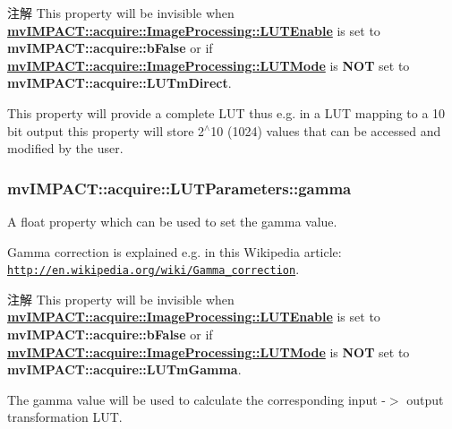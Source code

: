 \begin{DoxyNote}{注解}
This property will be invisible when {\bfseries \hyperlink{classmv_i_m_p_a_c_t_1_1acquire_1_1_image_processing_a7f8eb83578d97fde3405e6ae5d09e5c3}{mv\+I\+M\+P\+A\+C\+T\+::acquire\+::\+Image\+Processing\+::\+L\+U\+T\+Enable}} is set to {\bfseries mv\+I\+M\+P\+A\+C\+T\+::acquire\+::b\+False} or if {\bfseries \hyperlink{classmv_i_m_p_a_c_t_1_1acquire_1_1_image_processing_ae2f3059a3574e6a08a2d4348f1d5a152}{mv\+I\+M\+P\+A\+C\+T\+::acquire\+::\+Image\+Processing\+::\+L\+U\+T\+Mode}} is {\bfseries N\+O\+T} set to {\bfseries mv\+I\+M\+P\+A\+C\+T\+::acquire\+::\+L\+U\+Tm\+Direct}.
\end{DoxyNote}
This property will provide a complete L\+U\+T thus e.\+g. in a L\+U\+T mapping to a 10 bit output this property will store 2$^\wedge$10 (1024) values that can be accessed and modified by the user. \hypertarget{classmv_i_m_p_a_c_t_1_1acquire_1_1_l_u_t_parameters_a3be2f11e6b176d9b9494116d992b2e00}{
\subsubsection[{gamma}]{ mv\+I\+M\+P\+A\+C\+T\+::acquire\+::\+L\+U\+T\+Parameters\+::gamma}}\label{classmv_i_m_p_a_c_t_1_1acquire_1_1_l_u_t_parameters_a3be2f11e6b176d9b9494116d992b2e00}


A float property which can be used to set the gamma value. 

Gamma correction is explained e.\+g. in this Wikipedia article\+: \href{http://en.wikipedia.org/wiki/Gamma_correction}{\tt http\+://en.\+wikipedia.\+org/wiki/\+Gamma\+\_\+correction}.

\begin{DoxyNote}{注解}
This property will be invisible when {\bfseries \hyperlink{classmv_i_m_p_a_c_t_1_1acquire_1_1_image_processing_a7f8eb83578d97fde3405e6ae5d09e5c3}{mv\+I\+M\+P\+A\+C\+T\+::acquire\+::\+Image\+Processing\+::\+L\+U\+T\+Enable}} is set to {\bfseries mv\+I\+M\+P\+A\+C\+T\+::acquire\+::b\+False} or if {\bfseries \hyperlink{classmv_i_m_p_a_c_t_1_1acquire_1_1_image_processing_ae2f3059a3574e6a08a2d4348f1d5a152}{mv\+I\+M\+P\+A\+C\+T\+::acquire\+::\+Image\+Processing\+::\+L\+U\+T\+Mode}} is {\bfseries N\+O\+T} set to {\bfseries mv\+I\+M\+P\+A\+C\+T\+::acquire\+::\+L\+U\+Tm\+Gamma}.
\end{DoxyNote}
The gamma value will be used to calculate the corresponding input -\/$>$ output transformation L\+U\+T.


